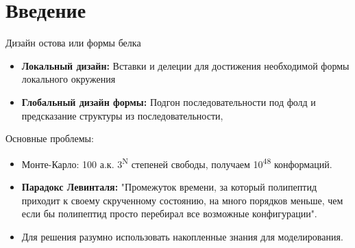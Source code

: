 
\begin{frame}
[plain]
  \titlepage
\end{frame}
\section{Введение}
\begin{frame}
{Дизайн остова или формы белка}{}
 \begin{itemize}
  \item
      \textbf{Локальный дизайн:} Вставки и делеции для достижения необходимой формы локального окружения
\vspace{0.2cm}
  \item
	  \textbf{Глобальный дизайн формы:} Подгон последовательности под фолд и предсказание структуры из последовательности, 
\vspace{0.2cm}
 \end{itemize}
\end{frame}
\begin{frame}{Основные проблемы:}{}
 \begin{itemize}
  \item
	  Монте-Карло: 100 а.к. 3\textsuperscript{N} степеней свободы, получаем 10\textsuperscript{48} конформаций.
\vspace{0.2cm}
  \item
	  \textbf{Парадокс Левинталя:} "Промежуток времени, за который полипептид приходит к своему скрученному состоянию, на много порядков меньше, чем если бы полипептид просто перебирал все возможные конфигурации".
\vspace{0.2cm}
  \item
Для решения разумно использовать накопленные знания для моделирования.
 \end{itemize}
\end{frame}

